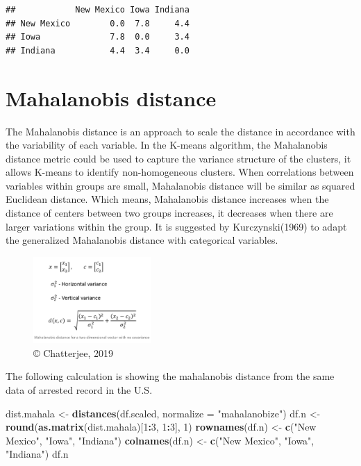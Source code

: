 \documentclass[]{book}
\newenvironment{Shaded}{\begin{snugshade}}{\end{snugshade}}
\newcommand{\DataTypeTok}[1]{\textcolor[rgb]{0.13,0.29,0.53}{#1}}
\newcommand{\DecValTok}[1]{\textcolor[rgb]{0.00,0.00,0.81}{#1}}
\newcommand{\KeywordTok}[1]{\textcolor[rgb]{0.13,0.29,0.53}{\textbf{#1}}}
\newcommand{\NormalTok}[1]{#1}
\newcommand{\OperatorTok}[1]{\textcolor[rgb]{0.81,0.36,0.00}{\textbf{#1}}}
\newcommand{\StringTok}[1]{\textcolor[rgb]{0.31,0.60,0.02}{#1}}
\begin{document}
\begin{verbatim}
##            New Mexico Iowa Indiana
## New Mexico        0.0  7.8     4.4
## Iowa              7.8  0.0     3.4
## Indiana           4.4  3.4     0.0
\end{verbatim}

\hypertarget{mahalanobis-distance}{%
\section{Mahalanobis distance}\label{mahalanobis-distance}}

The Mahalanobis distance is an approach to scale the distance in accordance with the variability of each variable. In the K-means algorithm, the Mahalanobis distance metric could be used to capture the variance structure of the clusters, it allows K-means to identify non-homogeneous clusters. When correlations between variables within groups are small, Mahalanobis distance will be similar as squared Euclidean distance. Which means, Mahalanobis distance increases when the distance of centers between two groups increases, it decreases when there are larger variations within the group. It is suggested by Kurczynski(1969) to adapt the generalized Mahalanobis distance with categorical variables.

\begin{figure}
\centering
\includegraphics[width=0.4\textwidth,height=\textheight]{Mahala.png}
\caption{© Chatterjee, 2019}
\end{figure}

The following calculation is showing the mahalanobis distance from the same data of arrested record in the U.S.

\begin{Shaded}
\begin{Highlighting}[]
\NormalTok{dist.mahala <-}\StringTok{ }\KeywordTok{distances}\NormalTok{(df.scaled, }\DataTypeTok{normalize =} \StringTok{"mahalanobize"}\NormalTok{)}
\NormalTok{df.n <-}\StringTok{ }\KeywordTok{round}\NormalTok{(}\KeywordTok{as.matrix}\NormalTok{(dist.mahala)[}\DecValTok{1}\OperatorTok{:}\DecValTok{3}\NormalTok{, }\DecValTok{1}\OperatorTok{:}\DecValTok{3}\NormalTok{], }\DecValTok{1}\NormalTok{)}
\KeywordTok{rownames}\NormalTok{(df.n) <-}\StringTok{ }\KeywordTok{c}\NormalTok{(}\StringTok{"New Mexico"}\NormalTok{, }\StringTok{"Iowa"}\NormalTok{, }\StringTok{"Indiana"}\NormalTok{)}
\KeywordTok{colnames}\NormalTok{(df.n) <-}\StringTok{ }\KeywordTok{c}\NormalTok{(}\StringTok{"New Mexico"}\NormalTok{, }\StringTok{"Iowa"}\NormalTok{, }\StringTok{"Indiana"}\NormalTok{)}
\NormalTok{df.n }
\end{Highlighting}
\end{Shaded}
\end{document}

